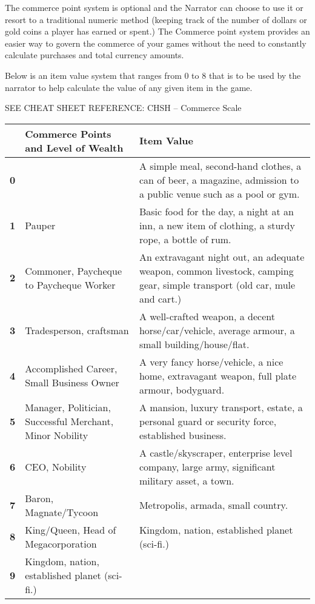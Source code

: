 The commerce point system is optional and the Narrator can choose to use it or resort to a traditional numeric method (keeping track of the number of dollars or gold coins a player has earned or spent.) The Commerce point system provides an easier way to govern the commerce of your games without the need to constantly calculate purchases and total currency amounts.

Below is an item value system that ranges from 0 to 8 that is to be used by the narrator to help calculate the value of any given item in the game.

SEE CHEAT SHEET REFERENCE: CHSH – Commerce Scale

\begin{center}
    \begin{tabularx}{\textwidth}{|c|X|X|} 
     \hline
       & \textbf{Commerce Points and Level of Wealth} & \textbf{Item Value} \\ 
     \hline
     \textbf{0} &   & A simple meal, second-hand clothes, a can of beer, a magazine, admission to a public venue such as a pool or gym. \\ 
     \textbf{1} & Pauper & Basic food for the day, a night at an inn, a new item of clothing, a sturdy rope, a bottle of rum. \\
     \textbf{2} & Commoner, Paycheque to Paycheque Worker & An extravagant night out, an adequate weapon, common livestock, camping gear, simple transport (old car, mule and cart.) \\
     \textbf{3} & Tradesperson, craftsman & A well-crafted weapon, a decent horse/car/vehicle, average armour, a small building/house/flat. \\
     \textbf{4} & Accomplished Career, Small Business Owner & A very fancy horse/vehicle, a nice home, extravagant weapon, full plate armour, bodyguard. \\
     \textbf{5} & Manager, Politician, Successful Merchant, Minor Nobility & A mansion, luxury transport, estate, a personal guard or security force, established business. \\
     \textbf{6} & CEO, Nobility & A castle/skyscraper, enterprise level company, large army, significant military asset, a town. \\
     \textbf{7} & Baron, Magnate/Tycoon & Metropolis, armada, small country. \\
     \textbf{8} & King/Queen, Head of Megacorporation & Kingdom, nation, established planet (sci-fi.) \\
     \textbf{9} & Kingdom, nation, established planet (sci-fi.) &  \\
     \hline
    \end{tabularx}
\end{center}

